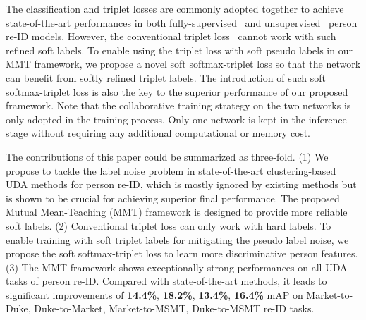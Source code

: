 \documentclass{article} \usepackage{iclr2020_conference,times}
\begin{document}
The classification and triplet losses are commonly adopted together to achieve state-of-the-art performances in both fully-supervised~\citep{luo2019bag} and unsupervised~\citep{zhang2019self,yang2019selfsimilarity} person re-ID models.
However, the conventional triplet loss~\citep{hermans2017defense} cannot work with such refined soft labels.
To enable using the triplet loss with soft pseudo labels in our MMT framework, we propose a novel soft softmax-triplet loss so that the network can benefit from softly refined triplet labels. 
The introduction of such soft softmax-triplet loss is also the key to the superior performance of our proposed framework.
Note that the collaborative training strategy on the two networks is only adopted in the training process. Only one network is kept in the inference stage without requiring any additional computational or memory cost.


The contributions of this paper could be summarized as three-fold.
(1) We propose to tackle the label noise problem in state-of-the-art clustering-based UDA methods for person re-ID, which is mostly ignored by existing methods but is shown to be crucial for achieving superior final performance.
{The proposed Mutual Mean-Teaching (MMT) framework is designed to provide more reliable soft labels.}
(2) Conventional triplet loss can only work with hard labels. To enable training with soft triplet labels for mitigating the pseudo label noise, we propose the soft softmax-triplet loss to learn more discriminative person features.
(3)
The MMT framework shows exceptionally strong performances on all UDA tasks of person re-ID.
Compared with state-of-the-art methods, it leads to significant improvements of \textbf{14.4\%}, \textbf{18.2\%}, \textbf{13.4\%}, \textbf{16.4\%} mAP on Market-to-Duke, Duke-to-Market, Market-to-MSMT, Duke-to-MSMT re-ID tasks.
\end{document}
